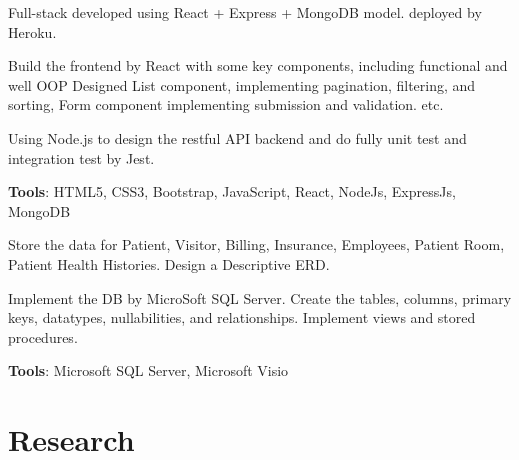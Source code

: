 \documentclass[letterpaper]{deedy-resume} %
\begin{document}
\begin{minipage}[t]{0.66\textwidth}
\vspace{\topsep} %
\begin{tightitemize}
\item Full-stack developed using React + Express + MongoDB model.
deployed by Heroku.
\item Build the frontend by React with some key components, including functional and well OOP Designed List component, implementing pagination, filtering, and sorting, Form component implementing submission and validation. etc.
\item Using Node.js to design the restful API backend and do fully unit test and integration test by Jest.
\item \textbf{Tools}: HTML5, CSS3, Bootstrap, JavaScript, React, NodeJs, ExpressJs, MongoDB
\end{tightitemize}

\sectionspace %
\vspace{\topsep} %
\begin{tightitemize}
\item Store the data for Patient, Visitor, Billing, Insurance, Employees, Patient Room, Patient Health Histories. Design a Descriptive ERD.
\item Implement the DB by MicroSoft SQL Server. Create the tables, columns, primary keys, datatypes, nullabilities, and relationships. Implement views and stored procedures.
\item \textbf{Tools}: Microsoft SQL Server, Microsoft Visio
\end{tightitemize}

\sectionspace %


\section{Research}


\end{minipage}
\end{document}
